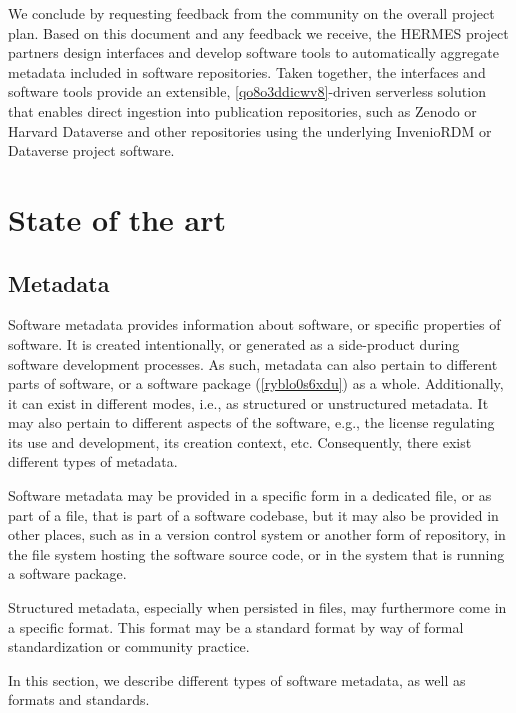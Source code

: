 \documentclass{article}
\begin{document}
We conclude by requesting feedback from the community on the overall project plan. Based on this document and any feedback we receive, the HERMES project partners design interfaces and develop software tools to automatically aggregate metadata included in software repositories. Taken together, the interfaces and software tools provide an extensible, \ref{qo8o3ddicwv8}-driven serverless solution that enables direct ingestion into publication repositories, such as Zenodo or Harvard Dataverse and other repositories using the underlying InvenioRDM or Dataverse project software. 



\section{State of the art}\label{sec:state-of-the-art}


\subsection{Metadata}\label{subsec:metadata}
Software metadata provides information about software, or specific properties of software. It is created intentionally, or generated as a side-product during software development processes. As such, metadata can also pertain to different parts of software, or a software package (\ref{ryblo0s6xdu}) as a whole. Additionally, it can exist in different modes, i.e., as structured or unstructured metadata. It may also pertain to different aspects of the software, e.g., the license regulating its use and development, its creation context, etc. Consequently, there exist different types of metadata.

Software metadata may be provided in a specific form in a dedicated file, or as part of a file, that is part of a software codebase, but it may also be provided in other places, such as in a version control system or another form of repository, in the file system hosting the software source code, or in the system that is running a software package.  

Structured metadata, especially when persisted in files, may furthermore come in a specific format. This format may be a standard format by way of formal standardization or community practice.

In this section, we describe different types of software metadata, as well as formats and standards.
\end{document}
